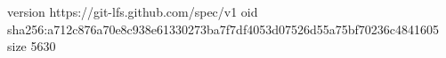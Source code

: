 version https://git-lfs.github.com/spec/v1
oid sha256:a712c876a70e8c938e61330273ba7f7df4053d07526d55a75bf70236c4841605
size 5630
